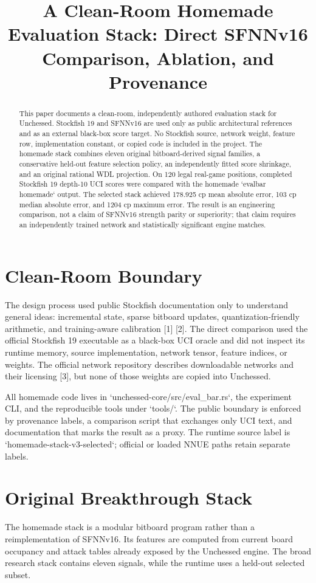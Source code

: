\documentclass[10pt,conference]{IEEEtran}
\title{A Clean-Room Homemade Evaluation Stack: Direct SFNNv16 Comparison, Ablation, and Provenance}
\author{\IEEEauthorblockN{Manus AI}\IEEEauthorblockA{Unchessed UCI Engine Research\\September 2026}}
\begin{document}
\maketitle
\begin{abstract}
This paper documents a clean-room, independently authored evaluation stack for Unchessed. Stockfish 19 and SFNNv16 are used only as public architectural references and as an external black-box score target. No Stockfish source, network weight, feature row, implementation constant, or copied code is included in the project. The homemade stack combines eleven original bitboard-derived signal families, a conservative held-out feature selection policy, an independently fitted score shrinkage, and an original rational WDL projection. On 120 legal real-game positions, completed Stockfish 19 depth-10 UCI scores were compared with the homemade `evalbar homemade` output. The selected stack achieved 178.925 cp mean absolute error, 103 cp median absolute error, and 1204 cp maximum error. The result is an engineering comparison, not a claim of SFNNv16 strength parity or superiority; that claim requires an independently trained network and statistically significant engine matches.
\end{abstract}

\section{Clean-Room Boundary}
The design process used public Stockfish documentation only to understand general ideas: incremental state, sparse bitboard updates, quantization-friendly arithmetic, and training-aware calibration [1] [2]. The direct comparison used the official Stockfish 19 executable as a black-box UCI oracle and did not inspect its runtime memory, source implementation, network tensor, feature indices, or weights. The official network repository describes downloadable networks and their licensing [3], but none of those weights are copied into Unchessed.

All homemade code lives in `unchessed-core/src/eval\_bar.rs`, the experiment CLI, and the reproducible tools under `tools/`. The public boundary is enforced by provenance labels, a comparison script that exchanges only UCI text, and documentation that marks the result as a proxy. The runtime source label is `homemade-stack-v3-selected`; official or loaded NNUE paths retain separate labels.

\section{Original Breakthrough Stack}
The homemade stack is a modular bitboard program rather than a reimplementation of SFNNv16. Its features are computed from current board occupancy and attack tables already exposed by the Unchessed engine. The broad research stack contains eleven signals, while the runtime uses a held-out selected subset.
\end{document}
